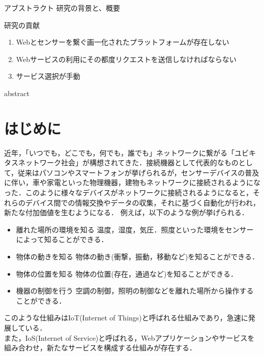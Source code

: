 \documentclass{kuisthesis}			%
\date{平成28年2月6日}				%
\begin{document}
\maketitle					%

\begin{jabstract}				%
アブストラクト
研究の背景と、概要

研究の貢献
\begin{enumerate}
\item
Webとセンサーを繋ぐ画一化されたプラットフォームが存在しない
\item
Webサービスの利用にその都度リクエストを送信しなければならない
\item
サービス選択が手動
\end{enumerate}
\end{jabstract}
\begin{eabstract}				%
abstract

\end{eabstract}

\tableofcontents				%

\section{はじめに}\label{sec-intro}		%
近年，「いつでも，どこでも，何でも，誰でも」ネットワークに繋がる「ユビキタスネットワーク社会」が構想されてきた．接続機器として代表的なものとして，従来はパソコンやスマートフォンが挙げられるが，センサーデバイスの普及に伴い，車や家電といった物理機器，建物もネットワークに接続されるようになった．このように様々なデバイスがネットワークに接続されるようになると，それらのデバイス間での情報交換やデータの収集，それに基づく自動化が行われ，新たな付加価値を生むようになる．%
例えば，以下のような例が挙げられる．
\begin{itemize}
\item 離れた場所の環境を知る
温度，湿度，気圧．照度といった環境をセンサーによって知ることができる．
\item 物体の動きを知る
物体の動き(衝撃，振動，移動など)を知ることができる．
\item 物体の位置を知る
物体の位置(存在，通過など)を知ることができる．
\item 機器の制御を行う
空調の制御，照明の制御などを離れた場所から操作することができる．
\end{itemize}
このような仕組みはIoT(Internet of Things)と呼ばれる仕組みであり，急速に発展している．\\
また，IoS(Internet of Service)と呼ばれる，Webアプリケーションやサービスを組み合わせ，新たなサービスを構成する仕組みが存在する．
\end{document}
